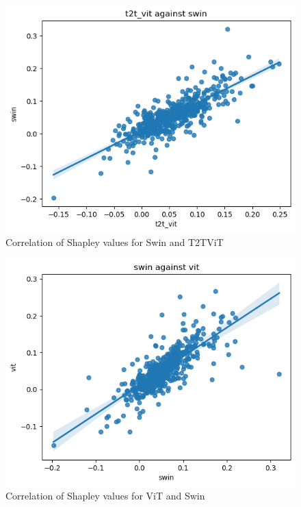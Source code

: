 \documentclass[magisterska,en]{pracamgr}
\begin{document}
\begin{figure}[H]
\centering
\includegraphics[scale=0.5]{./images/shap_swin_t2t_vit.png}
\caption{Correlation of Shapley values for Swin and T2T\textunderscore ViT}
\label{shap_swin_t2t_vit}
\end{figure}

\begin{figure}[H]
\centering
\includegraphics[scale=0.5]{./images/shap_vit_swin.png}
\caption{Correlation of Shapley values for ViT and Swin}
\label{shap_vit_swin}
\end{figure}
\end{document}
